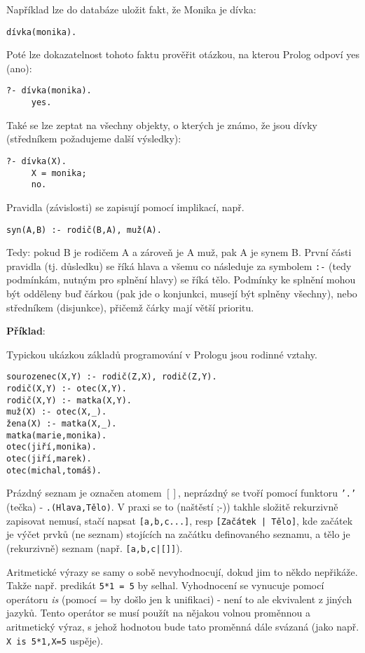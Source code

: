 Například lze do databáze uložit fakt, že Monika je dívka:
\begin{verbatim}
dívka(monika).
\end{verbatim}

Poté lze dokazatelnost tohoto faktu prověřit otázkou, na kterou Prolog odpoví yes (ano):
\begin{verbatim}
?- dívka(monika).
     yes.
\end{verbatim}

Také se lze zeptat na všechny objekty, o kterých je známo, že jsou dívky (středníkem požadujeme další výsledky):
\begin{verbatim}
?- dívka(X).
     X = monika;
     no.
\end{verbatim}

Pravidla (závislosti) se zapisují pomocí implikací, např.
\begin{verbatim}
syn(A,B) :- rodič(B,A), muž(A).
\end{verbatim}

Tedy: pokud B je rodičem A a zároveň je A muž, pak A je synem B. První části pravidla (tj. důsledku) se říká hlava a všemu co následuje za symbolem \texttt{:-} (tedy podmínkám, nutným pro splnění hlavy) se říká tělo. Podmínky ke splnění mohou být odděleny buď čárkou (pak jde o konjunkci, musejí být splněny všechny), nebo středníkem (disjunkce), přičemž čárky mají větší prioritu.

\medskip\textbf{Příklad}:

Typickou ukázkou základů programování v Prologu jsou rodinné vztahy.
\begin{verbatim}
sourozenec(X,Y) :- rodič(Z,X), rodič(Z,Y).
rodič(X,Y) :- otec(X,Y).
rodič(X,Y) :- matka(X,Y).
muž(X) :- otec(X,_).
žena(X) :- matka(X,_).
matka(marie,monika).
otec(jiří,monika).
otec(jiří,marek).
otec(michal,tomáš).
\end{verbatim}

Prázdný seznam je označen atomem $[]$, neprázdný se tvoří pomocí funktoru \texttt{'.'} (tečka) - \texttt{.(Hlava,Tělo)}. V praxi se to (naštěstí ;-)) takhle složitě rekurzivně zapisovat nemusí, stačí napsat \texttt{[a,b,c...]}, resp \texttt{[Začátek | Tělo]}, kde začátek je výčet prvků (ne seznam) stojících na začátku definovaného seznamu, a tělo je (rekurzivně) seznam (např. \texttt{[a,b,c|[]]}).

Aritmetické výrazy se samy o sobě nevyhodnocují, dokud jim to někdo nepřikáže. Takže např. predikát \texttt{5*1 = 5} by selhal. Vyhodnocení se vynucuje pomocí operátoru \emph{is} (pomocí = by došlo jen k unifikaci) - není to ale ekvivalent \uv{\texttt{=}} z jiných jazyků. Tento operátor se musí použít na nějakou volnou proměnnou a aritmetický výraz, s jehož hodnotou bude tato proměnná dále svázaná (jako např. \texttt{X is 5*1,X=5} uspěje).

